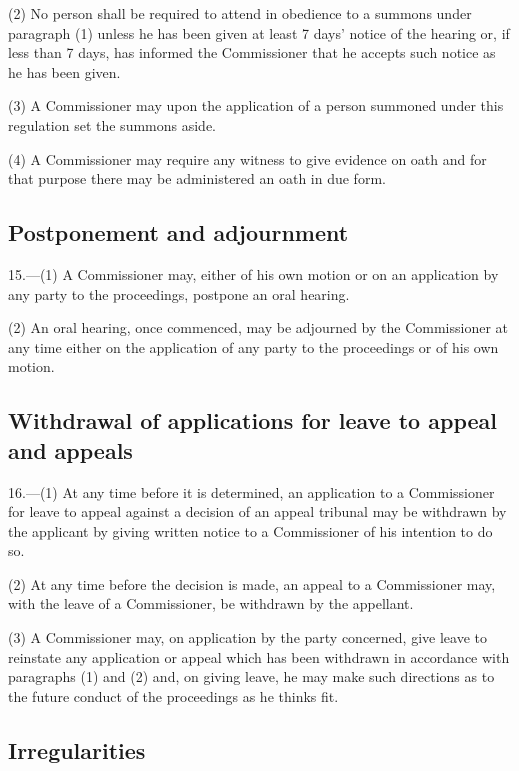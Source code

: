 \documentclass[a4paper]{article}
\begin{document}
(2) No person shall be required to attend in obedience to a summons under paragraph (1) unless he has been given at least 7 days' notice of the hearing or, if less than 7 days, has informed the Commissioner that he accepts such notice as he has been given.

(3) A Commissioner may upon the application of a person summoned under this regulation set the summons aside.

(4) A Commissioner may require any witness to give evidence on oath and for that purpose there may be administered an oath in due form.

\subsection[15. Postponement and adjournment]{Postponement and adjournment}

15.—(1) A Commissioner may, either of his own motion or on an application by any party to the proceedings, postpone an oral hearing.

(2) An oral hearing, once commenced, may be adjourned by the Commissioner at any time either on the application of any party to the proceedings or of his own motion.

\subsection[16. Withdrawal of applications for leave to appeal and appeals]{Withdrawal of applications for leave to appeal and appeals}

16.—(1) At any time before it is determined, an application to a Commissioner for leave to appeal against a decision of an appeal tribunal may be withdrawn by the applicant by giving written notice to a Commissioner of his intention to do so.

(2) At any time before the decision is made, an appeal to a Commissioner may, with the leave of a Commissioner, be withdrawn by the appellant.

(3) A Commissioner may, on application by the party concerned, give leave to reinstate any application or appeal which has been withdrawn in accordance with paragraphs (1) and (2) and, on giving leave, he may make such directions as to the future conduct of the proceedings as he thinks fit.

\subsection[17. Irregularities]{Irregularities}
\end{document}
